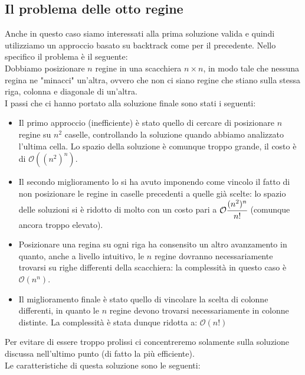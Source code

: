 \documentclass[../cheatSheetAlgoritmi.tex]{subfiles}
\begin{document}
\subsection{Il problema delle otto regine}
Anche in questo caso siamo interessati alla prima soluzione valida e quindi utilizziamo un approccio basato su backtrack come per il precedente. 
Nello specifico il problema è il seguente: \\
Dobbiamo posizionare $n$ regine in una scacchiera $n \times n$, in modo tale che nessuna regina ne "minacci" un'altra, ovvero che non ci siano regine che stiano sulla stessa riga, colonna e diagonale di un'altra.\\
I passi che ci hanno portato alla soluzione finale sono stati i seguenti:
\begin{itemize}
	\item Il primo approccio (inefficiente) è stato quello di cercare di posizionare $n$ regine su $n^2$ caselle, controllando la soluzione quando abbiamo analizzato l'ultima cella. Lo spazio della soluzione è comunque troppo grande, il costo è di $\mathcal{O}((n^2)^n)$.
	\item Il secondo miglioramento lo si ha avuto imponendo come vincolo il fatto di non posizionare le regine in caselle precedenti a quelle già scelte: lo spazio delle soluzioni si è ridotto di molto con un costo pari a  $\mathcal{O}\cfrac{(n^2)^n}{n!}$ (comunque ancora troppo elevato).
	\item Posizionare una regina su ogni riga ha consensito un altro avanzamento in quanto, anche a livello intuitivo, le $n$ regine dovranno necessariamente trovarsi su righe differenti della scacchiera: la complessità in questo caso è $\mathcal{O}(n^n)$.
	\item Il miglioramento finale è stato quello di vincolare la scelta di colonne differenti, in quanto le $n$ regine devono trovarsi necessariamente in colonne distinte. La complessità è stata dunque ridotta a: $\mathcal{O}(n!)$
\end{itemize}
Per evitare di essere troppo prolissi ci concentreremo solamente sulla soluzione discussa nell'ultimo punto (di fatto la più efficiente). \\
Le caratteristiche di questa soluzione sono le seguenti: 
\end{document}
